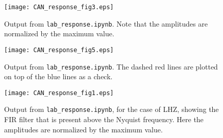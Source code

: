 \documentclass[11pt,titlepage,fleqn]{article}
\newcommand{\tfile}{{\tt lab\_response.ipynb}}
\begin{document}
\begin{figure}
\centering
\texttt{[image: CAN\_response\_fig3.eps]}
\caption[]
{{
Output from \tfile.
Note that the amplitudes are normalized by the maximum value.
}}
\label{fig1}
\end{figure}

\begin{figure}
\centering
\texttt{[image: CAN\_response\_fig5.eps]}
\caption[]
{{
Output from \tfile.
The dashed red lines are plotted on top of the blue lines as a check.
}}
\label{fig2}
\end{figure}

\begin{figure}
\centering
\texttt{[image: CAN\_response\_fig1.eps]}
\caption[]
{{
Output from \tfile, for the case of LHZ, showing the FIR filter that is present above the Nyquist frequency.
Here the amplitudes are normalized by the maximum value.
}}
\label{fig3}
\end{figure}

\end{document}
